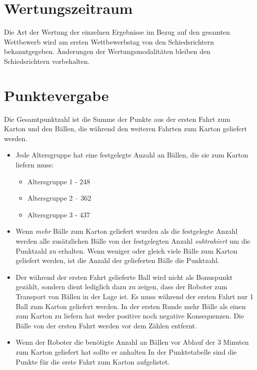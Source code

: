 \documentclass[a4paper,12pt]{article}
\begin{document}
\section{Wertungszeitraum}
\par Die Art der Wertung der einzelnen Ergebnisse im Bezug auf den gesamten Wettbewerb wird am ersten Wettbewerbstag von den Schiedsrichtern bekanntgegeben. Änderungen der Wertungsmodalitäten bleiben den Schiedsrichtern vorbehalten.
\section{Punktevergabe}
Die Gesamtpunktzahl ist die Summe der Punkte aus der ersten Fahrt zum Karton und den Bällen, die während
den weiteren Fahrten zum Karton geliefert werden.
\begin{itemize}
\item Jede Altersgruppe hat eine festgelegte Anzahl an Bällen, die sie zum Karton liefern muss:
\begin{itemize}
	\item Altersgruppe 1 - 248
\item Altersgruppe 2 – 362
\item Altersgruppe 3 - 437
\end{itemize}
\item Wenn \emph{mehr} Bälle zum Karton geliefert wurden als die festgelegte Anzahl werden alle zusätzlichen Bälle von
der festgelegten Anzahl \emph{subtrahiert} um die Punktzahl zu erhalten. Wenn weniger oder gleich viele Bälle zum
Karton geliefert werden, ist die Anzahl der gelieferten Bälle die Punktzahl.
\item Der während der ersten Fahrt gelieferte Ball wird nicht als Bonuspunkt gezählt, sondern dient lediglich dazu
zu zeigen, dass der Roboter zum Transport von Bällen in der Lage ist. Es muss während der ersten Fahrt nur
1 Ball zum Karton geliefert werden. In der ersten Runde mehr Bälle als einen zum Karton zu liefern hat weder
positive noch negative Konsequenzen. Die Bälle von der ersten Fahrt werden vor dem Zählen entfernt.
\item Wenn der Roboter die benötigte Anzahl an Bällen vor Ablauf der 3 Minuten zum Karton geliefert hat sollte er
anhalten
In der Punktetabelle sind die Punkte für die erste Fahrt zum Karton aufgelistet.
\end{itemize}
\end{document}
